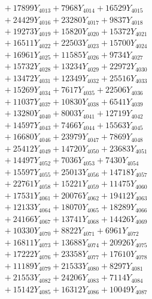 \documentclass[a4paper,10pt]{article}
\begin{document}
{\begin{align}
&\;  + 17899 Y_{4013} + 7968 Y_{4014} + 16529 Y_{4015} \\[0.3ex]
&\;  + 24429 Y_{4016} + 23280 Y_{4017} + 9837 Y_{4018} \\[0.5ex]\allowbreak
&\;  + 19273 Y_{4019} + 15820 Y_{4020} + 15372 Y_{4021} \\[0.3ex]
&\;  + 16511 Y_{4022} + 22503 Y_{4023} + 15700 Y_{4024} \\[0.3ex]
&\;  + 16961 Y_{4025} + 11585 Y_{4026} + 9734 Y_{4027} \\[0.3ex]
&\;  + 15732 Y_{4028} + 13234 Y_{4029} + 22972 Y_{4030} \\[0.3ex]
&\;  + 13472 Y_{4031} + 12349 Y_{4032} + 25516 Y_{4033} \\[0.3ex]
&\;  + 15269 Y_{4034} + 7617 Y_{4035} + 22506 Y_{4036} \\[0.3ex]
&\;  + 11037 Y_{4037} + 10830 Y_{4038} + 6541 Y_{4039} \\[0.3ex]
&\;  + 13280 Y_{4040} + 8003 Y_{4041} + 12719 Y_{4042} \\[0.3ex]
&\;  + 14597 Y_{4043} + 7466 Y_{4044} + 15563 Y_{4045} \\[0.3ex]
&\;  + 16680 Y_{4046} + 23979 Y_{4047} + 7869 Y_{4048} \\[0.5ex]\allowbreak
&\;  + 25412 Y_{4049} + 14720 Y_{4050} + 23683 Y_{4051} \\[0.3ex]
&\;  + 14497 Y_{4052} + 7036 Y_{4053} + 7430 Y_{4054} \\[0.3ex]
&\;  + 15597 Y_{4055} + 25013 Y_{4056} + 14718 Y_{4057} \\[0.3ex]
&\;  + 22761 Y_{4058} + 15221 Y_{4059} + 11475 Y_{4060} \\[0.3ex]
&\;  + 17531 Y_{4061} + 20076 Y_{4062} + 19412 Y_{4063} \\[0.3ex]
&\;  + 12133 Y_{4064} + 18070 Y_{4065} + 18289 Y_{4066} \\[0.3ex]
&\;  + 24166 Y_{4067} + 13741 Y_{4068} + 14426 Y_{4069} \\[0.3ex]
&\;  + 10330 Y_{4070} + 8822 Y_{4071} + 6961 Y_{4072} \\[0.3ex]
&\;  + 16811 Y_{4073} + 13688 Y_{4074} + 20926 Y_{4075} \\[0.3ex]
&\;  + 17222 Y_{4076} + 23358 Y_{4077} + 17610 Y_{4078} \\[0.5ex]\allowbreak
&\;  + 11189 Y_{4079} + 21533 Y_{4080} + 8297 Y_{4081} \\[0.3ex]
&\;  + 21553 Y_{4082} + 24206 Y_{4083} + 7114 Y_{4084} \\[0.3ex]
&\;  + 15142 Y_{4085} + 16312 Y_{4086} + 10049 Y_{4087} \\[0.3ex]

\end{align}}
\end{document}
